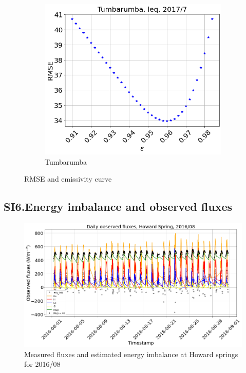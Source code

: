 \documentclass[fleqn,10pt]{wlscirep}
\begin{document}
\begin{figure}[h!]
\begin{subfigure}{.5\textwidth}
\end{subfigure}%
\begin{subfigure}{.5\textwidth}
  \centering
  \includegraphics[width=.95\linewidth]{tum_RMSE_2017}
  \caption{Tumbarumba}
\end{subfigure}
\setlength{\belowcaptionskip}{-3ex}
\caption{RMSE and emissivity curve}
\label{fig:rmse_eps}
\end{figure}

\subsection*{SI6.Energy imbalance and observed fluxes}
\label{Subsection:wnimb}
\begin{figure}[h!]
  \includegraphics[scale=0.5]{hs_enb.png}
  \caption{Measured fluxes and estimated energy imbalance at Howard springs for 2016/08}
  \label{fig:wninb}
  \end{figure}
\end{document}

